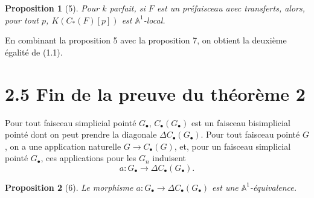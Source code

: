 \documentclass[11pt]{article}
\newcommand{\Aone}{\mathbb A^1}
\theoremstyle{deligne}
\newtheorem*{proposition*}{Proposition}
\begin{document}
\begin{proposition*}[5]
Pour \(k\) parfait, si \(F\) est un préfaisceau avec transferts, alors, pour tout \(p\), \(K(C_*(F)[p])\) est \(\Aone\)-local.
\end{proposition*}

En combinant la proposition 5 avec la proposition 7, on obtient la deuxième égalité de (1.1).

\section*{2.5 Fin de la preuve du théorème 2}

Pour tout faisceau simplicial pointé \(G_\bullet\), \(C_\bullet(G_\bullet)\) est un faisceau bisimplicial pointé dont on peut prendre la diagonale \(\Delta C_\bullet(G_\bullet)\). Pour tout faisceau pointé \(G\), on a une application naturelle \(G\to C_\bullet(G)\), et, pour un faisceau simplicial pointé \(G_\bullet\), ces applications pour les \(G_n\) induisent
\[
a:G_\bullet\longrightarrow \Delta C_\bullet(G_\bullet).
\]

\begin{proposition*}[6]
Le morphisme \(a:G_\bullet\to\Delta C_\bullet(G_\bullet)\) est une \(\Aone\)-équivalence.
\end{proposition*}
\end{document}
